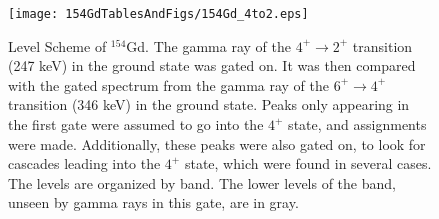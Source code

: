 \begin{landscape}
\begin{figure}[!]
    \centering
    \texttt{[image: 154GdTablesAndFigs/154Gd\_4to2.eps]}
    \caption{Level Scheme of $^{154}$Gd. The gamma ray of the $4^+\rightarrow2^+$ transition (247 keV) in the ground state was gated on. It was then compared with the gated spectrum from the gamma ray of the $6^+\rightarrow4^+$ transition (346 keV) in the ground state. Peaks only appearing in the first gate were assumed to go into the $4^+$ state, and assignments were made. Additionally, these peaks were also gated on, to look for cascades leading into the $4^+$ state, which were found in several cases. The levels are organized by band. The lower levels of the band, unseen by gamma rays in this gate, are in gray.}
    \label{fig:154_4to2}
\end{figure}
\end{landscape}